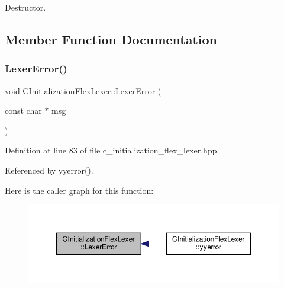 Destructor. 



\subsection{Member Function Documentation}
\mbox{\label{classCInitializationFlexLexer_ae81556aaaf77659a5b1a83c9318301c6}} 
\subsubsection{\texorpdfstring{Lexer\+Error()}{LexerError()}}
{\footnotesize\ttfamily void C\+Initialization\+Flex\+Lexer\+::\+Lexer\+Error (\begin{DoxyParamCaption}\item[{const char $\ast$}]{msg }\end{DoxyParamCaption})\hspace{0.3cm}{\ttfamily [inline]}}



Definition at line 83 of file c\+\_\+initialization\+\_\+flex\+\_\+lexer.\+hpp.



Referenced by yyerror().

Here is the caller graph for this function\+:
\nopagebreak
\begin{figure}[H]
\begin{center}
\leavevmode
\includegraphics[width=350pt]{de/d8d/classCInitializationFlexLexer_ae81556aaaf77659a5b1a83c9318301c6_icgraph}
\end{center}
\end{figure}
\mbox{\label{classCInitializationFlexLexer_a78b352766a89474e8becb50762c15150}} 
